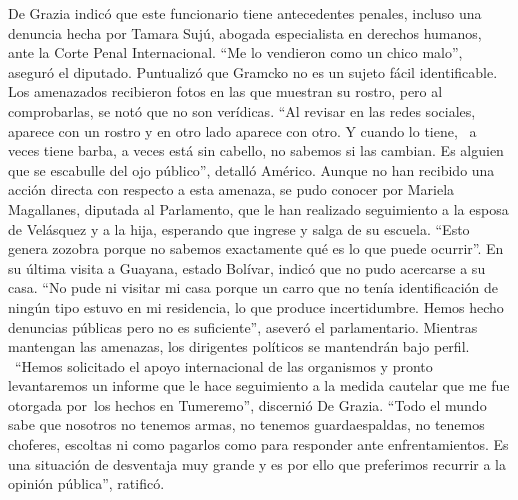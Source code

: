 \documentclass{article}%
\begin{document}
\newline%
%
De Grazia indicó que este funcionario tiene antecedentes penales, incluso una denuncia hecha por Tamara Sujú, abogada especialista en derechos humanos, ante la Corte Penal Internacional. “Me lo vendieron como un chico malo”, aseguró el diputado.%
\newline%
%
Puntualizó que Gramcko no es un sujeto fácil identificable. Los amenazados recibieron fotos en las que muestran su rostro, pero al comprobarlas, se notó que no son verídicas.%
\newline%
%
“Al revisar en las redes sociales, aparece con un rostro y en otro lado aparece con otro. Y cuando lo tiene, ~a veces tiene barba, a veces está sin cabello, no sabemos si las cambian. Es alguien que se escabulle del ojo público”, detalló Américo.%
\newline%
%
Aunque no han recibido una acción directa con respecto a esta amenaza, se pudo conocer por Mariela Magallanes, diputada al Parlamento, que le han realizado seguimiento a la esposa de Velásquez y a la hija, esperando que ingrese y salga de su escuela. “Esto genera zozobra porque no sabemos exactamente qué es lo que puede ocurrir”.%
\newline%
%
En su última visita a Guayana, estado Bolívar, indicó que no pudo acercarse a su casa. “No pude ni visitar mi casa porque un carro que no tenía identificación de ningún tipo estuvo en mi residencia, lo que produce incertidumbre. Hemos hecho denuncias públicas pero no es suficiente”, aseveró el parlamentario.%
\newline%
%
Mientras mantengan las amenazas, los dirigentes políticos se mantendrán bajo perfil. ~“Hemos solicitado el apoyo internacional de las organismos y pronto levantaremos un informe que le hace seguimiento a la medida cautelar que me fue otorgada por~los hechos en Tumeremo”, discernió De Grazia.%
\newline%
%
“Todo el mundo sabe que nosotros no tenemos armas, no tenemos guardaespaldas, no tenemos choferes, escoltas ni como pagarlos como para responder ante enfrentamientos. Es una situación de desventaja muy grande y es por ello que preferimos recurrir a la opinión pública”, ratificó.%
\newline%
%
\end{document}
